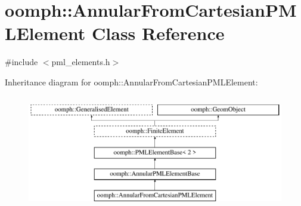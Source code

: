 \hypertarget{classoomph_1_1AnnularFromCartesianPMLElement}{}\section{oomph\+:\+:Annular\+From\+Cartesian\+P\+M\+L\+Element Class Reference}
\label{classoomph_1_1AnnularFromCartesianPMLElement}


{\ttfamily \#include $<$pml\+\_\+elements.\+h$>$}

Inheritance diagram for oomph\+:\+:Annular\+From\+Cartesian\+P\+M\+L\+Element\+:\begin{figure}[H]
\begin{center}
\leavevmode
\includegraphics[height=5.000000cm]{classoomph_1_1AnnularFromCartesianPMLElement}
\end{center}
\end{figure}
